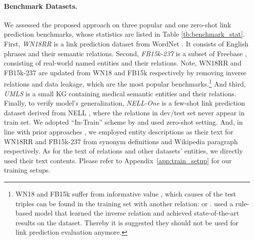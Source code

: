 \documentclass[sigconf]{acmart}
\begin{document}
\paragraph{Benchmark Datasets.}
We assessed the proposed approach on three popular and one zero-shot link prediction benchmarks, whose statistics are listed in Table \ref{tb:benchmark_stat}. 
First, \emph{WN18RR} \cite{ConvE} is a link prediction dataset from WordNet \cite{miller1998wordnet}. It consists of English phrases and their semantic relations. 
Second, \emph{FB15k-237} \cite{FB15k-237} is a subset of Freebase \cite{db/freebase}, consisting of real-world named entities and their relations. 
Note, WN18RR and FB15k-237 are updated from WN18 and FB15k \cite{TransE} respectively by removing inverse relations and data leakage, which are the most popular benchmarks.\footnote{
WN18 and FB15k suffer from informative value \cite{FB15k-237,ConvE}, which causes  of the test triples  can be found in the training set with another relation:  or . \citet{ConvE} used a rule-based model that learned the inverse relation and achieved state-of-the-art results on the dataset. Thereby it is suggested they should not be used for link prediction evaluation anymore. 
}
And third, \emph{UMLS} \cite{ConvE} is a small KG containing medical semantic entities and their relations. 
Finally, to verify model's generalization, \emph{NELL-One} \cite{one-shot} is a few-shot link prediction dataset derived from NELL \cite{NELL}, where the relations in dev/test set never appear in train set. We adopted ``In-Train'' scheme by \citet{few-shot} and used zero-shot setting. 
And, in line with prior approaches \cite{xiao2017ssp,yao2019kgbert}, we employed entity descriptions as their text for WN18RR and FB15k-237 from synonym definitions and Wikipedia paragraph \cite{xie2016representation} respectively. As for the text of relations and other datasets' entities, we directly used their text contents. 
Please refer to Appendix~\ref{app:train_setup} for our training setups. 
\end{document}
